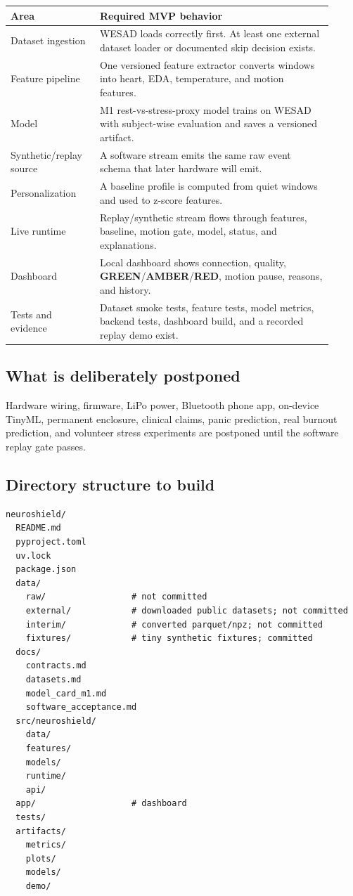 \documentclass[11pt,a4paper]{article}
\newcommand{\green}{\textbf{\textcolor{nsgreen}{GREEN}}}
\newcommand{\amberstatus}{\textbf{\textcolor{nsamber}{AMBER}}}
\newcommand{\redstatus}{\textbf{\textcolor{nsred}{RED}}}
\begin{document}
\begin{longtable}{P{0.25\linewidth}P{0.66\linewidth}}
\toprule
\textbf{Area} & \textbf{Required MVP behavior} \\
\midrule
Dataset ingestion & WESAD loads correctly first. At least one external dataset loader or documented skip decision exists. \\
Feature pipeline & One versioned feature extractor converts windows into heart, EDA, temperature, and motion features. \\
Model & M1 rest-vs-stress-proxy model trains on WESAD with subject-wise evaluation and saves a versioned artifact. \\
Synthetic/replay source & A software stream emits the same raw event schema that later hardware will emit. \\
Personalization & A baseline profile is computed from quiet windows and used to z-score features. \\
Live runtime & Replay/synthetic stream flows through features, baseline, motion gate, model, status, and explanations. \\
Dashboard & Local dashboard shows connection, quality, \green/\amberstatus/\redstatus, motion pause, reasons, and history. \\
Tests and evidence & Dataset smoke tests, feature tests, model metrics, backend tests, dashboard build, and a recorded replay demo exist. \\
\bottomrule
\end{longtable}

\subsection{What is deliberately postponed}

Hardware wiring, firmware, LiPo power, Bluetooth phone app, on-device TinyML, permanent enclosure,
clinical claims, panic prediction, real burnout prediction, and volunteer stress experiments are
postponed until the software replay gate passes.

\subsection{Directory structure to build}

\begin{lstlisting}
neuroshield/
  README.md
  pyproject.toml
  uv.lock
  package.json
  data/
    raw/                 # not committed
    external/            # downloaded public datasets; not committed
    interim/             # converted parquet/npz; not committed
    fixtures/            # tiny synthetic fixtures; committed
  docs/
    contracts.md
    datasets.md
    model_card_m1.md
    software_acceptance.md
  src/neuroshield/
    data/
    features/
    models/
    runtime/
    api/
  app/                   # dashboard
  tests/
  artifacts/
    metrics/
    plots/
    models/
    demo/
\end{lstlisting}
\end{document}
